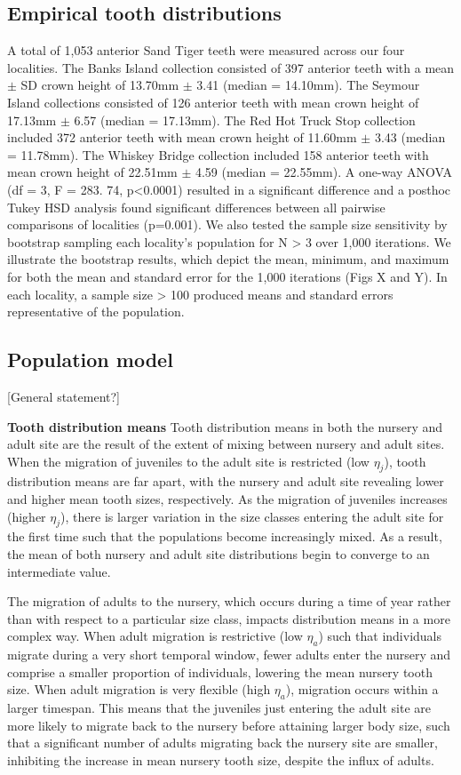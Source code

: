 \documentclass[]{rsos}%
\begin{document}
\subsection{Empirical tooth distributions}
A total of 1,053 anterior Sand Tiger teeth were measured across our four localities. 
The Banks Island collection consisted of 397 anterior teeth with a mean $\pm$ SD crown height of 13.70mm $\pm$ 3.41 (median = 14.10mm). 
The Seymour Island collections consisted of 126 anterior teeth with mean crown height of 17.13mm $\pm$ 6.57 (median = 17.13mm). 
The Red Hot Truck Stop collection included 372 anterior teeth with mean crown height of 11.60mm $\pm$ 3.43 (median = 11.78mm). 
The Whiskey Bridge collection included 158 anterior teeth with mean crown height of 22.51mm $\pm$ 4.59 (median = 22.55mm). 
A one-way ANOVA (df = 3, F = 283. 74, p<0.0001) resulted in a significant difference and a posthoc Tukey HSD analysis found significant differences between all pairwise comparisons of localities (p=0.001). 
We also tested the sample size sensitivity by bootstrap sampling each locality’s population for N > 3 over 1,000 iterations. 
We illustrate the bootstrap results, which depict the mean, minimum, and maximum for both the mean and standard error for the 1,000 iterations (Figs X and Y). 
In each locality, a sample size > 100 produced means and standard errors representative of the population. 

\subsection{Population model}
[General statement?]

\textbf{Tooth distribution means} Tooth distribution means in both the nursery and adult site are the result of the extent of mixing between nursery and adult sites.
When the migration of juveniles to the adult site is restricted (low $\eta_j$), tooth distribution means are far apart, with the nursery and adult site revealing lower and higher mean tooth sizes, respectively.
As the migration of juveniles increases (higher $\eta_j$), there is larger variation in the size classes entering the adult site for the first time such that the populations become increasingly mixed.
As a result, the mean of both nursery and adult site distributions begin to converge to an intermediate value.

The migration of adults to the nursery, which occurs during a time of year rather than with respect to a particular size class, impacts distribution means in a more complex way.
When adult migration is restrictive (low $\eta_a$) such that individuals migrate during a very short temporal window, fewer adults enter the nursery and comprise a smaller proportion of individuals, lowering the mean nursery tooth size.
When adult migration is very flexible (high $\eta_a$), migration occurs within a larger timespan.
This means that the juveniles just entering the adult site are more likely to migrate back to the nursery before attaining larger body size, such that a significant number of adults migrating back the nursery site are smaller, inhibiting the increase in mean nursery tooth size, despite the influx of adults.
\end{document}
